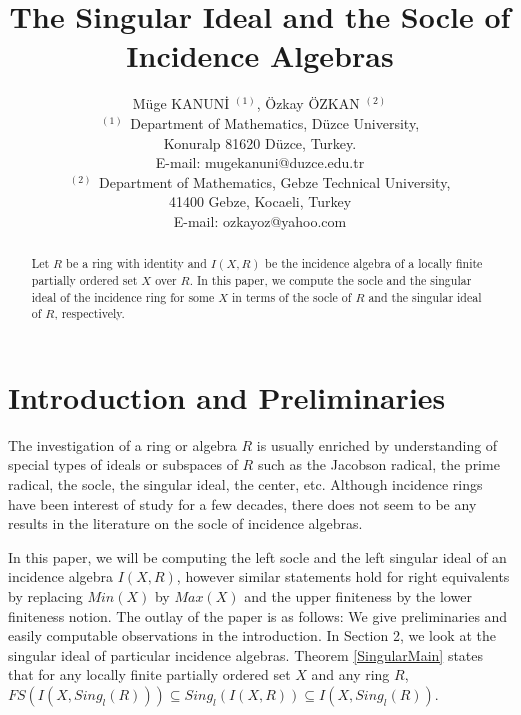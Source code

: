 \documentclass[12pt]{article}
\begin{document}
\title{The Singular Ideal and the Socle of Incidence Algebras
}
\author{M\"{u}ge KANUN\.{I} $^{(1)}$, \"Ozkay \"OZKAN $^{(2)}$\\$^{(1)\text{ }}$Department of Mathematics, D\"{u}zce University, \\Konuralp 81620 D\"{u}zce, Turkey.\\E-mail: mugekanuni@duzce.edu.tr\\$^{(2)\text{ }}$Department of Mathematics, Gebze Technical University, 
\\41400 Gebze, Kocaeli, Turkey\\E-mail: ozkayoz@yahoo.com\\}
\date{}
\maketitle




\begin{abstract}
Let $R$ be a ring with identity and $I(X,R)$ be the incidence algebra of a
locally finite partially ordered set $X$ over $R.$ In this paper, we compute
the socle and the singular ideal of the incidence ring for some $X$ in terms
of the socle of $R$ and the singular ideal of $R$, respectively.
\end{abstract}

\author{}
\maketitle

\section{Introduction and Preliminaries}

The investigation of a ring or algebra $R$ is usually enriched by
understanding of special types of ideals or subspaces of $R$ such as the
Jacobson radical, the prime radical, the socle, the singular ideal, the
center, etc. Although incidence rings have been interest of study for a few
decades, there does not seem to be any results in the literature on the
socle of incidence algebras.

In this paper, we will be computing the left socle and the left singular
ideal of an incidence algebra ${I(X,R)}$, however similar statements hold
for right equivalents by replacing $Min(X)$ by $Max(X)$ and the upper
finiteness by the lower finiteness notion. The outlay of the paper is as follows: 
We give preliminaries and easily computable observations in the introduction.
In Section 2, we look at the singular ideal of particular incidence algebras. Theorem \ref{SingularMain} states that for any locally finite partially ordered set $X$ and any ring $R$, $ FS(I(X,Sing_l(R))) \subseteq Sing_l({I(X,R)}) \subseteq I(X,Sing_l(R)).$ 
\end{document}
